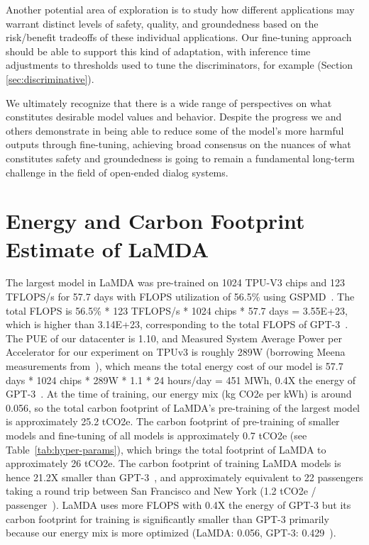 \documentclass{article}
\begin{document}
Another potential area of exploration is to study how different applications may warrant distinct levels of safety, quality, and groundedness based on the risk/benefit tradeoffs of these individual applications. Our fine-tuning approach should be able to support this kind of adaptation, with inference time adjustments to thresholds used to tune the discriminators, for example (Section \ref{sec:discriminative}).

We ultimately recognize that there is a wide range of perspectives on what constitutes desirable model values and behavior. Despite the progress we and others demonstrate in being able to reduce some of the model’s more harmful outputs through fine-tuning, achieving broad consensus on the nuances of what constitutes safety and groundedness is going to remain a fundamental long-term challenge in the field of open-ended dialog systems.

\section{Energy and Carbon Footprint Estimate of LaMDA}
\label{sec:co2-footprint}

The largest model in LaMDA was pre-trained on 1024 TPU-V3 chips and 123 TFLOPS/s for 57.7 days with FLOPS utilization of 56.5\% using GSPMD~\cite{gspmd21}. The total FLOPS is 56.5\% * 123 TFLOPS/s * 1024 chips * 57.7 days  = 3.55E+23, which is  higher than 3.14E+23, corresponding to the total FLOPS of GPT-3~\cite{gpt320}. The PUE of our datacenter is 1.10, and Measured System Average Power per Accelerator for our experiment on TPUv3 is roughly 289W (borrowing Meena measurements from~\cite{patterson2021carbon}),  which means the total energy cost of our model is 57.7 days * 1024 chips * 289W * 1.1 * 24 hours/day = 451 MWh, 0.4X the energy of GPT-3~\cite{gpt320,patterson2021carbon}. 
At the time of training, our energy mix (kg CO2e per kWh) is around 0.056, so the total carbon footprint of LaMDA's pre-training of the largest model is approximately 25.2 tCO2e. The carbon footprint of pre-training of smaller models and fine-tuning of all models is approximately 0.7 tCO2e (see Table~\ref{tab:hyper-params}),
 which brings the total footprint of LaMDA to approximately 26 tCO2e. 
The carbon footprint of training LaMDA models is hence 21.2X smaller than GPT-3~\cite{patterson2021carbon}, and approximately equivalent to 22 passengers taking a round trip between San
Francisco and New York (1.2 tCO2e / passenger~\cite{patterson2021carbon}). LaMDA uses more FLOPS with 0.4X the energy of GPT-3 but its carbon footprint for training is significantly smaller than GPT-3 primarily because our energy mix is more optimized (LaMDA: 0.056, GPT-3: 0.429~\cite{patterson2021carbon}). 
\end{document}

